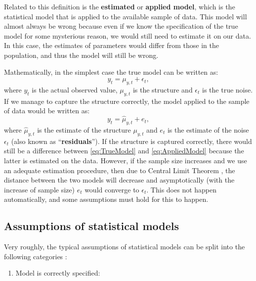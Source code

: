 \documentclass[]{book}
\providecommand{\tightlist}{%
  \setlength{\itemsep}{0pt}\setlength{\parskip}{0pt}}
\theoremstyle{definition}
\theoremstyle{definition}
\theoremstyle{definition}
\theoremstyle{definition}
\theoremstyle{remark}
\begin{document}
Related to this definition is the \textbf{estimated} or \textbf{applied model}, which is the statistical model that is applied to the available sample of data. This model will almost always be wrong because even if we know the specification of the true model for some mysterious reason, we would still need to estimate it on our data. In this case, the estimates of parameters would differ from those in the population, and thus the model will still be wrong.

Mathematically, in the simplest case the true model can be written as:
\begin{equation}
    y_t = \mu_{y,t} + \epsilon_t,
    \label{eq:TrueModel}
\end{equation}
where \(y_t\) is the actual observed value, \(\mu_{y,t}\) is the structure and \(\epsilon_t\) is the true noise. If we manage to capture the structure correctly, the model applied to the sample of data would be written as:
\begin{equation}
    y_t = \hat{\mu}_{y,t} + e_t,
    \label{eq:AppliedModel}
\end{equation}
where \(\hat{\mu}_{y,t}\) is the estimate of the structure \(\mu_{y,t}\) and \(e_t\) is the estimate of the noise \(\epsilon_t\) (also known as ``\textbf{residuals}''). If the structure is captured correctly, there would still be a difference between \eqref{eq:TrueModel} and \eqref{eq:AppliedModel} because the latter is estimated on the data. However, if the sample size increases and we use an adequate estimation procedure, then due to Central Limit Theorem \citep[see Chapter 4 of][]{SvetunkovSBA}, the distance between the two models will decrease and asymptotically (with the increase of sample size) \(e_t\) would converge to \(\epsilon_t\). This does not happen automatically, and some assumptions must hold for this to happen.

\hypertarget{assumptions}{%
\subsection{Assumptions of statistical models}\label{assumptions}}

Very roughly, the typical assumptions of statistical models can be split into the following categories \citep{SvetunkovSBA}:

\begin{enumerate}
\def\labelenumi{\arabic{enumi}.}
\tightlist
\item
  Model is correctly specified:
\end{enumerate}
\end{document}
